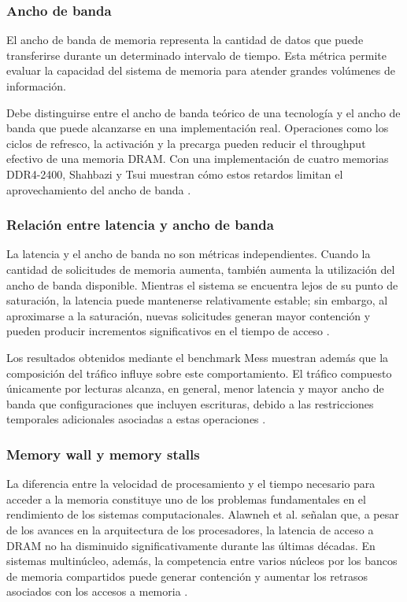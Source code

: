 \subsubsection{Ancho de banda}

El ancho de banda de memoria representa la cantidad de datos que puede
transferirse durante un determinado intervalo de tiempo. Esta métrica permite
evaluar la capacidad del sistema de memoria para atender grandes volúmenes de
información.

Debe distinguirse entre el ancho de banda teórico de una tecnología y el
ancho de banda que puede alcanzarse en una implementación real. Operaciones
como los ciclos de refresco, la activación y la precarga pueden reducir el
throughput efectivo de una memoria DRAM. Con una implementación de cuatro memorias
DDR4-2400, Shahbazi y Tsui muestran cómo estos retardos limitan el aprovechamiento 
del ancho de banda \cite{shahbazi2026ddr4}. 

\subsubsection{Relación entre latencia y ancho de banda}

La latencia y el ancho de banda no son métricas independientes. Cuando la
cantidad de solicitudes de memoria aumenta, también aumenta la utilización
del ancho de banda disponible. Mientras el sistema se encuentra lejos de su
punto de saturación, la latencia puede mantenerse relativamente estable; sin
embargo, al aproximarse a la saturación, nuevas solicitudes generan mayor
contención y pueden producir incrementos significativos en el tiempo de
acceso \cite{esmailidokht2024mess}.

Los resultados obtenidos mediante el benchmark Mess muestran además que la
composición del tráfico influye sobre este comportamiento. El tráfico
compuesto únicamente por lecturas alcanza, en general, menor latencia y mayor
ancho de banda que configuraciones que incluyen escrituras, debido a las
restricciones temporales adicionales asociadas a estas operaciones
\cite{esmailidokht2024mess}.

\subsubsection{Memory wall y memory stalls}

La diferencia entre la velocidad de procesamiento y el tiempo necesario para
acceder a la memoria constituye uno de los problemas fundamentales en el
rendimiento de los sistemas computacionales. Alawneh et al. señalan que,
a pesar de los avances en la arquitectura de los procesadores, la latencia
de acceso a DRAM no ha disminuido significativamente durante las últimas
décadas. En sistemas multinúcleo, además, la competencia entre varios núcleos
por los bancos de memoria compartidos puede generar contención y aumentar
los retrasos asociados con los accesos a memoria
\cite{alawneh2023dram}.

